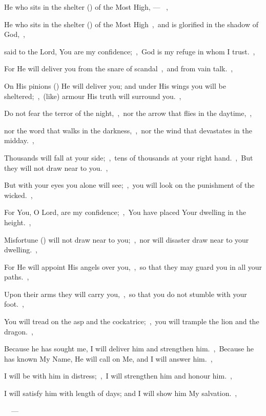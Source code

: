 \documentclass[12pt,twoside,a5paper]{article}
\begin{document}
\begin{halfparskip}
   He who sits in the shelter () of the Most High, --- ~\sep

  He who sits in the shelter () of the Most High~\sep\ and is glorified in the shadow of God,~\sep

  said to the Lord, You are my confidence;~\sep\ God is my refuge in whom I trust.~\sep

  For He will deliver you from the snare of scandal~\sep\ and from vain talk.~\sep

  On His pinions () He will deliver you; and under His wings you will be sheltered;~\sep\ (like) armour His truth will surround you.~\sep

  Do not fear the terror of the night,~\sep\ nor the arrow that flies in the daytime,~\sep

  nor the word that walks in the darkness,~\sep\ nor the wind that devastates in the midday.~\sep

  Thousands will fall at your side;~\sep\ tens of thousands at your right hand.~\sep\ But they will not draw near to you.~\sep

  But with your eyes you alone will see;~\sep\ you will look on the punishment of the wicked.~\sep

  For You, O Lord, are my confidence;~\sep\ You have placed Your dwelling in the height.~\sep

  Misfortune () will not draw near to you;~\sep\ nor will disaster draw near to your dwelling.~\sep

  For He will appoint His angels over you,~\sep\ so that they may guard you in all your paths.~\sep

  Upon their arms they will carry you,~\sep\ so that you do not stumble with your foot.~\sep

  You will tread on the asp and the cockatrice;~\sep\ you will trample the lion and the dragon.~\sep

  Because he has sought me, I will deliver him and strengthen him.~\sep\ Because he has known My Name, He will call on Me, and I will answer him.~\sep

  I will be with him in distress;~\sep\ I will strengthen him and honour him.~\sep

  I will satisfy him with length of days; and I will show him My salvation.~\sep

  \enbriefglory\ \enbrieffrom\ --- 

\end{halfparskip}
\end{document}

